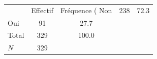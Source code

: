 {
\def\sym#1{\ifmmode^{#1}\else\(^{#1}\)\fi}
\begin{tabular}{l*{1}{cc}}
\toprule
            &    Effectif&Fréquence (%
\midrule
Non         &         238&        72.3\\
Oui         &          91&        27.7\\
Total       &         329&       100.0\\
\midrule
\(N\)       &         329&            \\
\bottomrule
\end{tabular}
}
